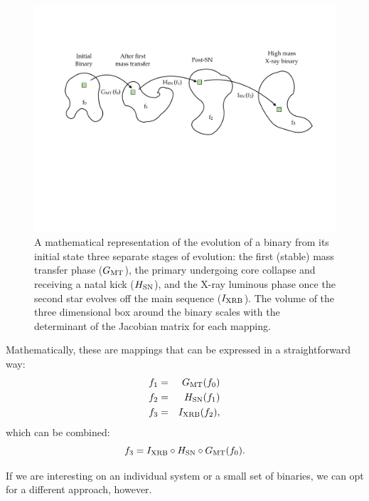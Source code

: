 \documentclass[12pt, preprint]{aastex}
\begin{document}
\begin{figure}[h!]
\begin{center}
\includegraphics[width=0.95\columnwidth]{Mapping.pdf}
\caption{A mathematical representation of the evolution of a binary from its initial state three separate stages of evolution: the first (stable) mass transfer phase ($G_{\rm MT}$), the primary undergoing core collapse and receiving a natal kick ($H_{\rm SN}$), and the X-ray luminous phase once the second star evolves off the main sequence ($I_{\rm XRB}$). The volume of the three dimensional box around the binary scales with the determinant of the Jacobian matrix for each mapping.}
\label{fig:Mapping}
\end{center}
\end{figure}

Mathematically, these are mappings that can be expressed in a straightforward way:
\begin{eqnarray}
f_1 &=& G_{\rm MT} (f_0) \\
f_2 &=& H_{\rm SN} (f_1) \\
f_3 &=& I_{\rm XRB} (f_2), \\
\end{eqnarray}
which can be combined:
\begin{equation}
f_3 = I_{\rm XRB} \circ H_{\rm SN} \circ G_{\rm MT} ( f_0).
\end{equation}


If we are interesting on an individual system or a small set of binaries, we can opt for a different approach, however.
\end{document}
